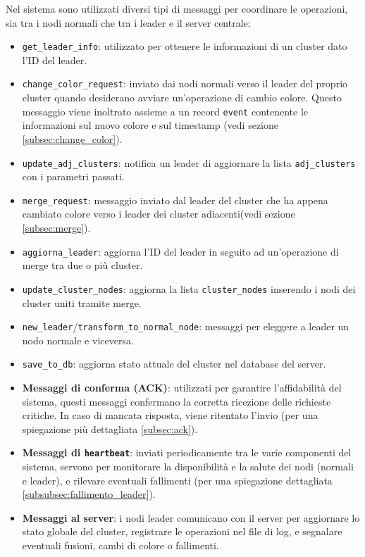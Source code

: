 \documentclass[12pt, a4paper]{report}
\begin{document}
Nel sistema sono utilizzati diversi tipi di messaggi per coordinare le operazioni, sia tra i nodi normali che tra i leader e il server centrale:

\begin{itemize}
    \item \texttt{get\_leader\_info}: utilizzato per ottenere le informazioni di un cluster dato l'ID del leader.
    \item \texttt{change\_color\_request}: inviato dai nodi normali verso il leader del proprio cluster quando desiderano avviare un'operazione di cambio colore. Questo messaggio viene inoltrato assieme a un record \texttt{event} contenente le informazioni sul nuovo colore e sul timestamp (vedi sezione \ref{subsec:change_color}).
    \item \texttt{update\_adj\_clusters}: notifica un leader di aggiornare la lista \texttt{adj\_clusters} con i parametri passati.
    \item \texttt{merge\_request}: messaggio inviato dal leader del cluster che ha appena cambiato colore verso i leader dei cluster adiacenti(vedi sezione \ref{subsec:merge}).
    \item \texttt{aggiorna\_leader}: aggiorna l'ID del leader in seguito ad un'operazione di merge tra due o pi\`u cluster.
    \item \texttt{update\_cluster\_nodes}: aggiorna la lista \texttt{cluster\_nodes} inserendo i nodi dei cluster uniti tramite merge.
    \item \texttt{new\_leader}/\texttt{transform\_to\_normal\_node}: messaggi per eleggere a leader un nodo normale e viceversa.
    \item \texttt{save\_to\_db}: aggiorna stato attuale del cluster nel database del server.
    \item \textbf{Messaggi di conferma (ACK)}: utilizzati per garantire l'affidabilit\`a del sistema, questi messaggi confermano la corretta ricezione delle richieste critiche. In caso di mancata risposta, viene ritentato l'invio (per una spiegazione pi\`u dettagliata \ref{subsec:ack}).
    \item \textbf{Messaggi di \texttt{heartbeat}}: inviati periodicamente tra le varie componenti del sistema, servono per monitorare la disponibilit\`a e la salute dei nodi (normali e leader), e rilevare eventuali fallimenti (per una spiegazione dettagliata \ref{subsubsec:fallimento_leader}). 
    \item \textbf{Messaggi al server}: i nodi leader comunicano con il server per aggiornare lo stato globale del cluster, registrare le operazioni nel file di log, e segnalare eventuali fusioni, cambi di colore o fallimenti.
\end{itemize}
\end{document}
